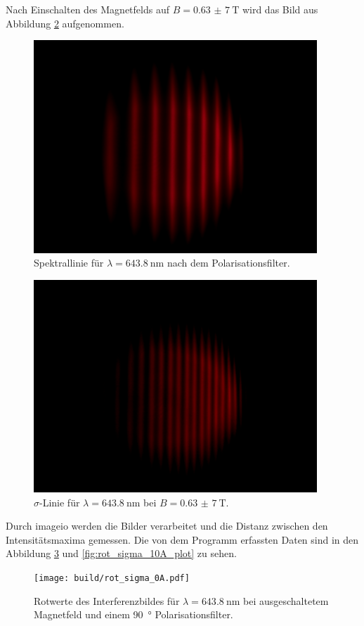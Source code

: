 Nach Einschalten des Magnetfelds auf $B=\SI{0,63(7)}{\tesla}$ wird das Bild aus Abbildung \ref{fig:rot_sigma_10A} aufgenommen.
\begin{figure}[htb]
  \centering
  \includegraphics[height=8cm]{content/pictures/rot_sigma_0A.png}
  \caption{Spektrallinie für $\lambda=\SI{643,8}{\nano\meter}$ nach dem Polarisationsfilter.}
  \label{fig:rot_sigma_0A}
\end{figure}
\begin{figure}[htb]
  \centering
  \includegraphics[height=8cm]{content/pictures/rot_sigma_10A.png}
  \caption{$\sigma$-Linie für $\lambda=\SI{643,8}{\nano\meter}$ bei $B=\SI{0,63(7)}{\tesla}$.}
  \label{fig:rot_sigma_10A}
\end{figure}
Durch imageio \cite{imageio} werden die Bilder verarbeitet und die Distanz zwischen den Intensitätsmaxima gemessen.
Die von dem Programm erfassten Daten sind in den Abbildung \ref{fig:rot_sigma_0A_plot} und \ref{fig:rot_sigma_10A_plot} zu sehen.
\begin{figure}[htb]
  \centering
  \texttt{[image: build/rot\_sigma\_0A.pdf]}
  \caption{Rotwerte des Interferenzbildes für $\lambda=\SI{643,8}{\nano\meter}$ bei ausgeschaltetem Magnetfeld und einem \SI{90}{\degree} Polarisationsfilter.}
  \label{fig:rot_sigma_0A_plot}
\end{figure}

